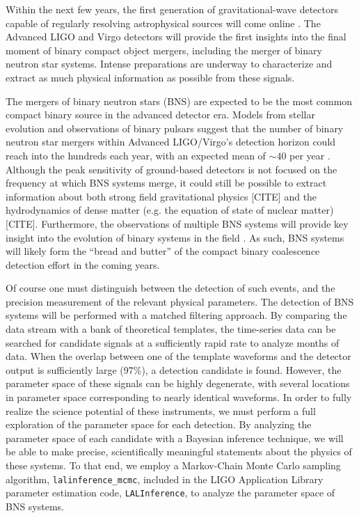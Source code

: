 \documentclass[11pt,a4paper]{emulateapj}
\newcommand{\carl}[1]{{\color{red}  #1}}
\begin{document}
Within the next few
 years, the first generation of gravitational-wave detectors capable 
 of regularly resolving astrophysical sources will come online \citep{AdvLIGO,AdvVirgo}.
 The Advanced LIGO and Virgo detectors will provide the first insights
 into the final moment of binary compact object mergers, including the 
 merger of binary neutron star systems.  Intense preparations are underway
 to characterize and extract as much physical 
 information as possible from these signals.
 
The mergers of binary neutron stars (BNS) are expected to be the most common
compact binary source in the advanced detector era.   Models from stellar 
evolution and observations of binary pulsars suggest that the number of binary neutron star mergers within 
Advanced LIGO/Virgo's detection horizon could reach into the hundreds each 
year, with an expected mean of $\sim 40$ per year \citep{RatesPaper}. 
Although the peak sensitivity of ground-based detectors
is not focused on the frequency at which BNS systems merge, it could still
be possible to extract information about both strong field gravitational 
physics \carl{[CITE]} and the hydrodynamics of dense matter (e.g. the equation 
of state of nuclear matter) \carl{[CITE]}.  Furthermore, the observations of multiple BNS
systems will provide key insight into the evolution of binary systems in the field \citep{VickyRates,KimRates}
. As such, BNS systems will likely 
form the ``bread and butter'' of the compact binary coalescence detection effort in the coming 
years.


Of course one must distinguish between the detection of 
such events, and the precision measurement of the relevant physical parameters.
The detection of BNS systems will be performed with a matched filtering approach.  
By comparing the data stream with a bank of theoretical templates, the 
 time-series data can be searched for candidate signals at a sufficiently
  rapid rate to analyze months of data.  When the overlap between one of the template waveforms and the 
detector output is sufficiently large (97\%), a detection candidate is found.  However,
the parameter space of these signals can be highly degenerate, with several 
locations in parameter space corresponding to nearly identical waveforms.  In 
order to fully realize the science potential of these instruments, we must 
perform a full exploration of the parameter space for each detection.  By 
analyzing the parameter space of each candidate with a Bayesian inference technique, 
 we will be able to make precise, scientifically meaningful
statements about the physics of these systems.  To 
that end, we employ a Markov-Chain Monte Carlo sampling algorithm, 
\texttt{lalinference\_mcmc}, included in the LIGO Application Library parameter
estimation code, \texttt{LALInference}, to analyze the parameter space of BNS systems.
\end{document}

